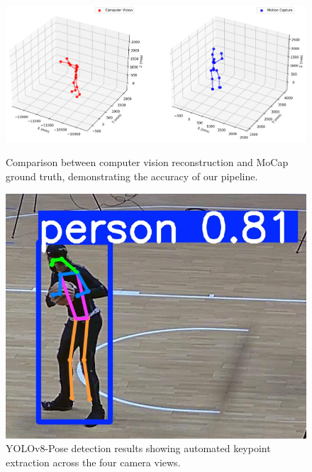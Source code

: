 \documentclass[11pt,a4paper]{article}
\begin{document}
\begin{figure}[htbp]
\centering
\begin{minipage}{0.48\textwidth}
  \centering
  \includegraphics[width=\textwidth]{samples/cv_vs_mocap.png}
  \caption{Comparison between computer vision reconstruction and MoCap ground truth, demonstrating the accuracy of our pipeline.}
  \label{fig:comparison}
\end{minipage}
\hfill
\begin{minipage}{0.35\textwidth}
  \centering
  \includegraphics[width=\textwidth]{samples/yolo_hpe.png}
  \caption{YOLOv8-Pose detection results showing automated keypoint extraction across the four camera views.}
  \label{fig:yolo}
\end{minipage}
\end{figure}
\end{document}
